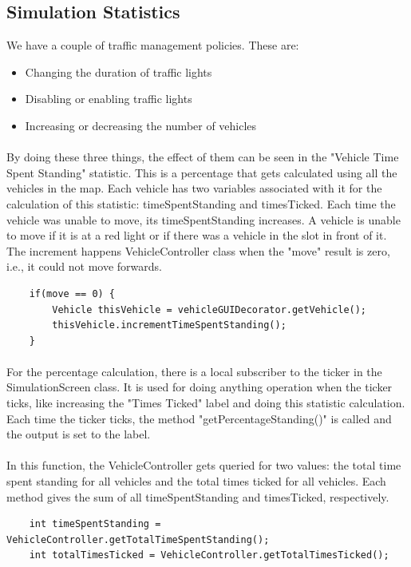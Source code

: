 \documentclass[a4paper,11pt,titlepage]{article}
\begin{document}
\subsection{Simulation Statistics}
We have a couple of traffic management policies. These are:
\begin{itemize}\itemsep1pt \parskip0pt 
\item Changing the duration of traffic lights
\item Disabling or enabling traffic lights
\item Increasing or decreasing the number of vehicles
\end{itemize}
\paragraph{}
By doing these three things, the effect of them can be seen in the "Vehicle Time Spent Standing" statistic. This is a percentage that gets calculated using all the vehicles in the map. Each vehicle has two variables associated with it for the calculation of this statistic: timeSpentStanding and timesTicked. Each time the vehicle was unable to move, its timeSpentStanding increases. A vehicle is unable to move if it is at a red light or if there was a vehicle in the slot in front of it. The increment happens VehicleController class when the "move" result is zero, i.e., it could not move forwards.
\begin{lstlisting}
	if(move == 0) {
		Vehicle thisVehicle = vehicleGUIDecorator.getVehicle();
		thisVehicle.incrementTimeSpentStanding();
	}
\end{lstlisting}
\paragraph{}
For the percentage calculation, there is a local subscriber to the ticker in the SimulationScreen class. It is used for doing anything operation when the ticker ticks, like increasing the "Times Ticked" label and doing this statistic calculation. Each time the ticker ticks, the method "getPercentageStanding()" is called and the output is set to the label.
\paragraph{}
In this function, the VehicleController gets queried for two values: the total time spent standing for all vehicles and the total times ticked for all vehicles. Each method gives the sum of all timeSpentStanding and timesTicked, respectively. 
\begin{lstlisting}
	int timeSpentStanding = VehicleController.getTotalTimeSpentStanding();
	int totalTimesTicked = VehicleController.getTotalTimesTicked();
\end{lstlisting}
\end{document}
